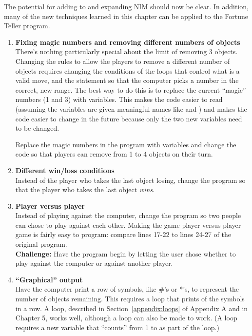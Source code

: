 The potential for adding to and expanding NIM should now be clear.  In addition, many of the new techniques learned in this chapter can be applied to the Fortune Teller program.  
\begin{enumerate}[{\bf 1.}]

\item {\bf Fixing magic numbers and removing different numbers of objects} \\
There's nothing particularly special about the limit of removing 3 objects.  Changing the rules to allow the players to remove a different number of objects requires changing the conditions of the loops that control what is a valid move, and the  statement so that the computer picks a number in the correct, new range.  The best way to do this is to replace the current ``magic'' numbers (1 and 3) with variables.  This makes the code easier to read (assuming the variables are given meaningful names like  and ) and makes the code easier to change in the future because only the two new variables need to be changed.

Replace the magic numbers in the program with variables and change the code so that players can remove from 1 to 4 objects on their turn.

\item {\bf Different win/loss conditions}\\  Instead of the player who takes the last object losing, change the program so that the player who takes the last object \emph{wins}.

\item {\bf Player versus player}\\ Instead of playing against the computer, change the program so two people can chose to play against each other.  Making the game player versus player game is fairly easy to program: compare lines 17-22 to lines 24-27 of the original program. \\
 {\bf Challenge:} Have the program begin by letting the user chose whether to play against the computer or against another player.

\item {\bf ``Graphical'' output}\\  Have the computer print a row of symbols, like \#'s or *'s, to represent the number of objects remaining.  This requires a loop that prints  of the symbols in a row.  A  loop, described in Section~\ref{appendix:loops} of Appendix A and in Chapter 5, works well, although a  loop can also be made to work.  (A  loop requires a new variable that ``counts'' from 1 to  as part of the loop.)


\end{enumerate}
